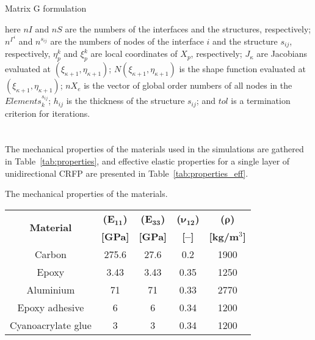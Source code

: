 \documentclass[sensors,article,accept,moreauthors,pdftex]{Definitions/mdpi}
\begin{document}
\begin{paracol}{2}
\begin{algorithm}
{{		}
	}
	
	\caption{Matrix G formulation}
	\label{alg:G_matrix}
\end{algorithm}
here \(nI\) and \(nS\) are the numbers of the interfaces and the structures, respectively; \(n^{\Gamma^i}\) and \(n^{s_{ij}}\) are the numbers of nodes of the interface \(i\) and the structure \(s_{ij}\), respectively, \(\eta^k_p\) and  \(\xi^k_p\) are local coordinates of \(X_p\), respectively;  \(J_{\kappa}\) are Jacobians evaluated at \((\xi_{\kappa+1},\eta_{\kappa+1})\); \(N(\xi_{\kappa+1},\eta_{\kappa+1})\) is the shape function evaluated at \((\xi_{\kappa+1},\eta_{\kappa+1})\); \(nX_e\) is the vector of global order numbers of all nodes in the \(Elements^{s_{ij}}_k\); \(h_{ij}\) is the thickness of the structure \(s_{ij}\); and \(tol\) is a termination criterion for iterations.

\section{}
\label{app:properties}
The mechanical properties of the materials used in the simulations are gathered in Table~\ref{tab:properties}, and effective elastic properties for a single layer of unidirectional CRFP are presented in Table~\ref{tab:properties_eff}.
\appendix
\vspace{-6pt}
\begin{specialtable}[H]
\small
\tabcolsep=0.75cm
	\caption{\label{tab:properties}The mechanical properties of the materials.}
	\begin{tabular}{ccccc}\toprule
		\multirow{2}{*}{\textbf{Material}} & \textbf{(}$\boldsymbol{E_{11}}$\textbf{)} &  \textbf{(}$\boldsymbol{E_{33}}$\textbf{)} & \textbf{(}$\boldsymbol{\nu_{12}}$\textbf{)} & \textbf{(}$\boldsymbol{\rho}$\textbf{)} \\
		& \textbf{[GPa]} &  \textbf{[GPa]} & \textbf{[--]} & \textbf{[kg/m\(^3\)]}\\
		\midrule
		Carbon & 275.6 & 27.6 & 0.2 & 1900\\
		Epoxy & 3.43 & 3.43 & 0.35 & 1250\\
		Aluminium & 71 & 71 & 0.33 & 2770\\
		Epoxy adhesive & 6 & 6 & 0.34 & 1200\\
		Cyanoacrylate glue & 3 & 3 & 0.34 & 1200\\		
		\bottomrule
	\end{tabular}
\end{specialtable}
\end{paracol}
\end{document}

